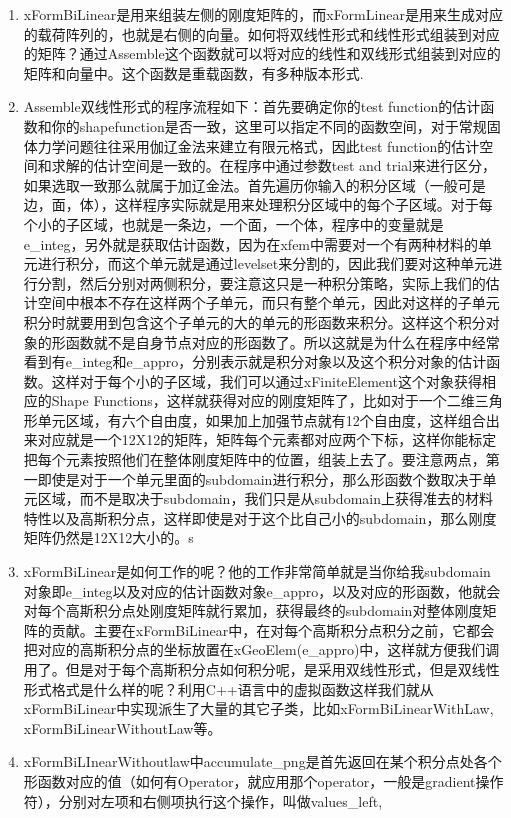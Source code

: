 \documentclass{article}
\begin{document}
\begin{enumerate}
\item xFormBiLinear是用来组装左侧的刚度矩阵的，而xFormLinear是用来生成对应的载荷阵列的，也就是右侧的向量。如何将双线性形式和线性形式组装到对应的矩阵？通过Assemble这个函数就可以将对应的线性和双线形式组装到对应的矩阵和向量中。这个函数是重载函数，有多种版本形式. 
\item Assemble双线性形式的程序流程如下：首先要确定你的test function的估计函数和你的shapefunction是否一致，这里可以指定不同的函数空间，对于常规固体力学问题往往采用伽辽金法来建立有限元格式，因此test
function的估计空间和求解的估计空间是一致的。在程序中通过参数test and trial来进行区分，如果选取一致那么就属于加辽金法。首先遍历你输入的积分区域（一般可是边，面，体），这样程序实际就是用来处理积分区域中的每个子区域。对于每个小的子区域，也就是一条边，一个面，一个体，程序中的变量就是e\_integ，另外就是获取估计函数，因为在xfem中需要对一个有两种材料的单元进行积分，而这个单元就是通过levelset来分割的，因此我们要对这种单元进行分割，然后分别对两侧积分，要注意这只是一种积分策略，实际上我们的估计空间中根本不存在这样两个子单元，而只有整个单元，因此对这样的子单元积分时就要用到包含这个子单元的大的单元的形函数来积分。这样这个积分对象的形函数就不是自身节点对应的形函数了。所以这就是为什么在程序中经常看到有e\_integ和e\_appro，分别表示就是积分对象以及这个积分对象的估计函数。这样对于每个小的子区域，我们可以通过xFiniteElement这个对象获得相应的Shape
Functions，这样就获得对应的刚度矩阵了，比如对于一个二维三角形单元区域，有六个自由度，如果加上加强节点就有12个自由度，这样组合出来对应就是一个12X12的矩阵，矩阵每个元素都对应两个下标，这样你能标定把每个元素按照他们在整体刚度矩阵中的位置，组装上去了。要注意两点，第一即使是对于一个单元里面的subdomain进行积分，那么形函数个数取决于单元区域，而不是取决于subdomain，我们只是从subdomain上获得准去的材料特性以及高斯积分点，这样即使是对于这个比自己小的subdomain，那么刚度矩阵仍然是12X12大小的。s 
\item xFormBiLinear是如何工作的呢？他的工作非常简单就是当你给我subdomain对象即e\_integ以及对应的估计函数对象e\_appro，以及对应的形函数，他就会对每个高斯积分点处刚度矩阵就行累加，获得最终的subdomain对整体刚度矩阵的贡献。主要在xFormBiLinear中，在对每个高斯积分点积分之前，它都会把对应的高斯积分点的坐标放置在xGeoElem(e\_appro)中，这样就方便我们调用了。但是对于每个高斯积分点如何积分呢，是采用双线性形式，但是双线性形式格式是什么样的呢？利用C++语言中的虚拟函数这样我们就从xFormBiLinear中实现派生了大量的其它子类，比如xFormBiLinearWithLaw,
xFormBiLinearWithoutLaw等。 
\item xFormBiLInearWithoutlaw中accumulate\_png是首先返回在某个积分点处各个形函数对应的值（如何有Operator，就应用那个operator，一般是gradient操作符），分别对左项和右侧项执行这个操作，叫做values\_left,

\end{enumerate}
\end{document}
